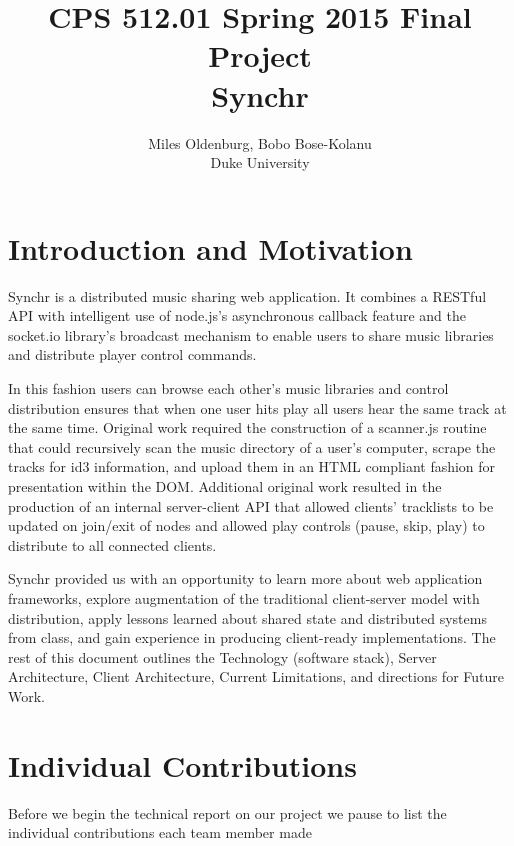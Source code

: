 \documentclass[12pt]{article}
\title{CPS 512.01 Spring 2015 Final Project \\ Synchr}
\author{Miles Oldenburg, Bobo Bose-Kolanu \\ Duke University}
\begin{document}
\maketitle

\newpage

\tableofcontents

\newpage

\section{Introduction and Motivation}

Synchr is a distributed music sharing web application. It combines a RESTful API with intelligent use of node.js’s asynchronous callback feature and the socket.io library’s broadcast mechanism to enable users to share music libraries and distribute player control commands. 

In this fashion users can browse each other’s music libraries and control distribution ensures that when one user hits play all users hear the same track at the same time. Original work required the construction of a scanner.js routine that could recursively scan the music directory of a user’s computer, scrape the tracks for id3 information, and upload them in an HTML compliant fashion for presentation within the DOM. Additional original work resulted in the production of an internal server-client API that allowed clients’ tracklists to be updated on join/exit of nodes and allowed play controls (pause, skip, play) to distribute to all connected clients.

Synchr provided us with an opportunity to learn more about web application frameworks, explore augmentation of the traditional client-server model with distribution, apply lessons learned about shared state and distributed systems from class, and gain experience in producing client-ready implementations. The rest of this document outlines the Technology (software stack), Server Architecture, Client Architecture, Current Limitations, and directions for Future Work.

\section{Individual Contributions}
Before we begin the technical report on our project we pause to list the individual contributions each team member made
\\
\end{document}
